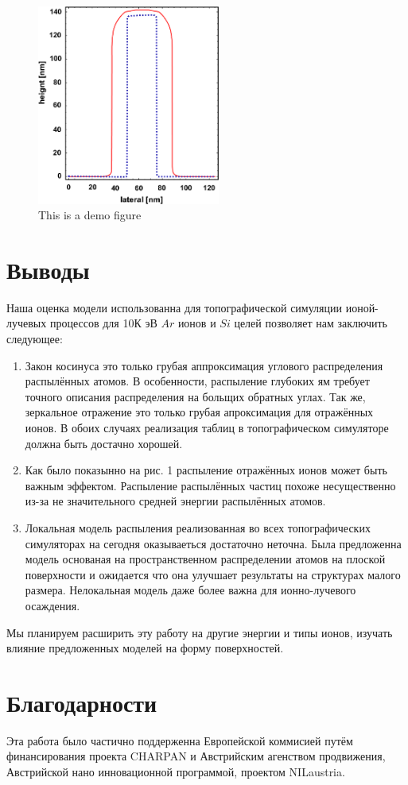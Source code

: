 \documentclass[a4paper,fontsize=12pt]{article}
\begin{document}
\begin{figure}[h]
    \centering
    \includegraphics[width=6cm]{images/5.eps}
    \caption{This is a demo figure}
    \label{fig:demo1}
\end{figure}

\section{Выводы}
Наша оценка модели использованна для топографической симуляции ионой-лучевых процессов для 10К эВ $Ar$ ионов и $Si$ целей позволяет нам заключить следующее:

\begin{enumerate}
  \item Закон косинуса это только грубая аппроксимация углового распределения распылённых атомов. В особенности, распыление глубоких ям требует точного описания распределения на больщих обратных углах. Так же, зеркальное отражение это только грубая апроксимация для отражённых ионов. В обоих случаях реализация таблиц в топографическом симуляторе должна быть достачно хорошей.
  \item Как было показынно на рис. 1 распыление отражённых ионов может быть важным эффектом. Распыление распылённых частиц похоже несущественно из-за не значительного средней энергии распылённых атомов.
  \item Локальная модель распыления реализованная во всех топографических симуляторах на сегодня оказываеться достаточно неточна. Была предложенна модель основаная на пространственном распределении атомов на плоской поверхности и ожидается что она улучшает результаты на структурах малого размера. Нелокальная модель даже более важна для ионно-лучевого осаждения.
\end{enumerate}

Мы планируем расширить эту работу на другие энергии и типы ионов, изучать влияние предложенных моделей на форму поверхностей.

\section{Благодарности}

Эта работа было частично поддерженна Европейской коммисией путём финансирования проекта CHARPAN и Австрийским агенством продвижения, Австрийской нано инновационной программой, проектом NILaustria.
\end{document}
